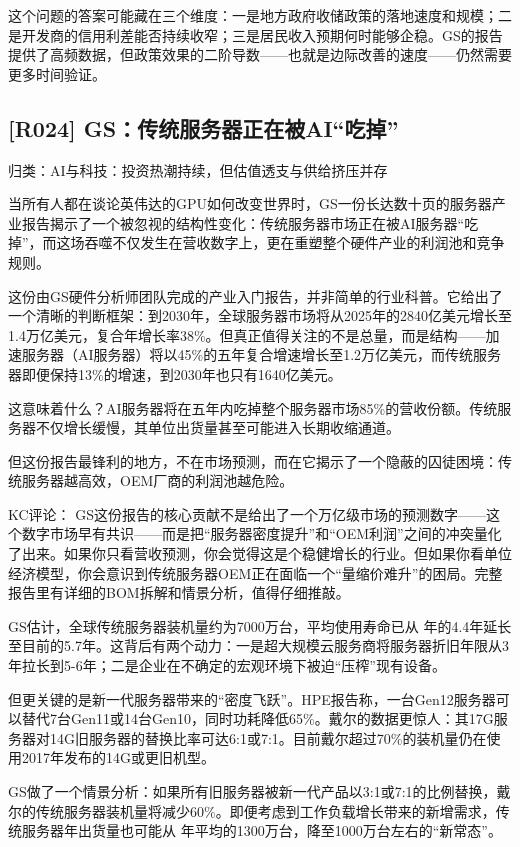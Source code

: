 \documentclass[11pt]{ctexart}
\begin{document}
这个问题的答案可能藏在三个维度：一是地方政府收储政策的落地速度和规模；二是开发商的信用利差能否持续收窄；三是居民收入预期何时能够企稳。GS的报告提供了高频数据，但政策效果的二阶导数——也就是边际改善的速度——仍然需要更多时间验证。

\subsection{[R024] GS：传统服务器正在被AI“吃掉”}
{\small\color{refgray}归类：AI与科技：投资热潮持续，但估值透支与供给挤压并存}

当所有人都在谈论英伟达的GPU如何改变世界时，GS一份长达数十页的服务器产业报告揭示了一个被忽视的结构性变化：传统服务器市场正在被AI服务器“吃掉”，而这场吞噬不仅发生在营收数字上，更在重塑整个硬件产业的利润池和竞争规则。

这份由GS硬件分析师团队完成的产业入门报告，并非简单的行业科普。它给出了一个清晰的判断框架：到2030年，全球服务器市场将从2025年的2840亿美元增长至1.4万亿美元，复合年增长率38\%。但真正值得关注的不是总量，而是结构——加速服务器（AI服务器）将以45\%的五年复合增速增长至1.2万亿美元，而传统服务器即便保持13\%的增速，到2030年也只有1640亿美元。

这意味着什么？AI服务器将在五年内吃掉整个服务器市场85\%的营收份额。传统服务器不仅增长缓慢，其单位出货量甚至可能进入长期收缩通道。

但这份报告最锋利的地方，不在市场预测，而在它揭示了一个隐蔽的囚徒困境：传统服务器越高效，OEM厂商的利润池越危险。

KC评论： GS这份报告的核心贡献不是给出了一个万亿级市场的预测数字——这个数字市场早有共识——而是把“服务器密度提升”和“OEM利润”之间的冲突量化了出来。如果你只看营收预测，你会觉得这是个稳健增长的行业。但如果你看单位经济模型，你会意识到传统服务器OEM正在面临一个“量缩价难升”的困局。完整报告里有详细的BOM拆解和情景分析，值得仔细推敲。

GS估计，全球传统服务器装机量约为7000万台，平均使用寿命已从 年的4.4年延长至目前的5.7年。这背后有两个动力：一是超大规模云服务商将服务器折旧年限从3年拉长到5-6年；二是企业在不确定的宏观环境下被迫“压榨”现有设备。

但更关键的是新一代服务器带来的“密度飞跃”。HPE报告称，一台Gen12服务器可以替代7台Gen11或14台Gen10，同时功耗降低65\%。戴尔的数据更惊人：其17G服务器对14G旧服务器的替换比率可达6:1或7:1。目前戴尔超过70\%的装机量仍在使用2017年发布的14G或更旧机型。

GS做了一个情景分析：如果所有旧服务器被新一代产品以3:1或7:1的比例替换，戴尔的传统服务器装机量将减少60\%。即便考虑到工作负载增长带来的新增需求，传统服务器年出货量也可能从 年平均的1300万台，降至1000万台左右的“新常态”。
\end{document}
